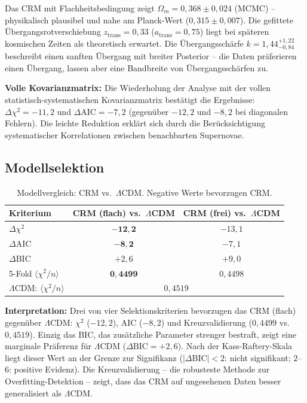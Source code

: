 \documentclass[aps,prd,twocolumn,superscriptaddress,nofootinbib]{revtex4-2}
\begin{document}
Das CRM mit Flachheitsbedingung zeigt $\Omega_m = 0{,}368 \pm 0{,}024$ (MCMC) -- physikalisch plausibel und nahe am Planck-Wert ($0{,}315 \pm 0{,}007$). Die gefittete \"Ubergangsrotverschiebung $z_{\mathrm{trans}} = 0{,}33$ ($a_{\mathrm{trans}} = 0{,}75$) liegt bei sp\"ateren kosmischen Zeiten als theoretisch erwartet. Die \"Ubergangssch\"arfe $k = 1{,}44^{+1{,}22}_{-0{,}84}$ beschreibt einen sanften \"Ubergang mit breiter Posterior -- die Daten pr\"aferieren einen \"Ubergang, lassen aber eine Bandbreite von \"Ubergangssch\"arfen zu.

\textbf{Volle Kovarianzmatrix:} Die Wiederholung der Analyse mit der vollen statistisch-systematischen Kovarianzmatrix best\"atigt die Ergebnisse: $\Delta\chi^2 = -11{,}2$ und $\Delta\mathrm{AIC} = -7{,}2$ (gegen\"uber $-12{,}2$ und $-8{,}2$ bei diagonalen Fehlern). Die leichte Reduktion erkl\"art sich durch die Ber\"ucksichtigung systematischer Korrelationen zwischen benachbarten Supernovae.

\subsection{Modellselektion}
\label{subsec:modellselektion}

\begin{table}[htbp]
\centering
\caption{Modellvergleich: CRM vs.\ $\Lambda$CDM. Negative Werte bevorzugen CRM.}
\label{tab:comparison}
\begin{tabular}{lcc}
\toprule
\textbf{Kriterium} & CRM (flach) vs.\ $\Lambda$CDM & CRM (frei) vs.\ $\Lambda$CDM \\
\midrule
$\Delta\chi^2$ & $\mathbf{-12{,}2}$ & $-13{,}1$ \\
$\Delta$AIC & $\mathbf{-8{,}2}$ & $-7{,}1$ \\
$\Delta$BIC & $+2{,}6$ & $+9{,}0$ \\
\midrule
5-Fold $\langle\chi^2/n\rangle$ & $\mathbf{0{,}4499}$ & $0{,}4498$ \\
$\Lambda$CDM: $\langle\chi^2/n\rangle$ & \multicolumn{2}{c}{$0{,}4519$} \\
\bottomrule
\end{tabular}
\end{table}

\textbf{Interpretation:} Drei von vier Selektionskriterien bevorzugen das CRM (flach) gegen\"uber $\Lambda$CDM: $\chi^2$ ($-12{,}2$), AIC ($-8{,}2$) und Kreuzvalidierung ($0{,}4499$ vs.\ $0{,}4519$). Einzig das BIC, das zus\"atzliche Parameter strenger bestraft, zeigt eine marginale Pr\"aferenz f\"ur $\Lambda$CDM ($\Delta\mathrm{BIC} = +2{,}6$). Nach der Kass-Raftery-Skala \cite{KassRaftery1995} liegt dieser Wert an der Grenze zur Signifikanz ($|\Delta\mathrm{BIC}| < 2$: nicht signifikant; $2$--$6$: positive Evidenz). Die Kreuzvalidierung -- die robusteste Methode zur Overfitting-Detektion -- zeigt, dass das CRM auf ungesehenen Daten besser generalisiert als $\Lambda$CDM.
\end{document}
